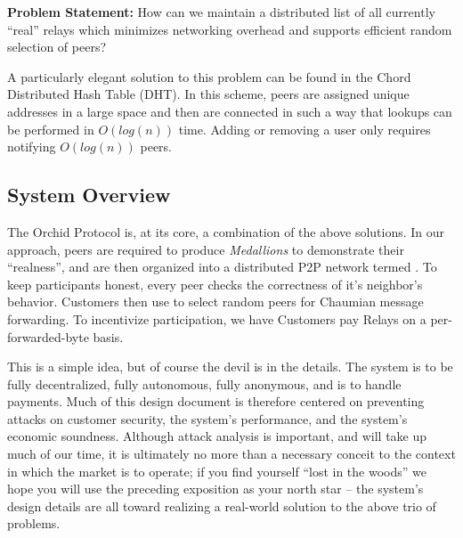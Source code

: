 \textbf{Problem Statement:} How can we maintain a distributed list of
all currently ``real'' relays which minimizes networking overhead and
supports efficient random selection of peers?

A particularly elegant solution to this problem can be found in the
Chord\cite{CHORD} Distributed Hash Table (DHT). In this scheme, peers
are assigned unique addresses in a large space and then are connected
in such a way that lookups can be performed in $O(log(n))$ time. Adding
or removing a user only requires notifying $O(log(n))$ peers.

\subsection{System Overview}

The Orchid Protocol is, at its core, a combination of the above
solutions. In our approach, peers are required to
produce \emph{Medallions} to demonstrate their ``realness'', and are
then organized into a distributed P2P network termed \tOM{}. To
keep \tOM{} participants honest, every peer checks the correctness of
it's neighbor's behavior. Customers then use \tOM{} to select random
peers for Chaumian message forwarding. To incentivize participation,
we have Customers pay Relays on a per-forwarded-byte basis.

This is a simple idea, but of course the devil is in the details. The
system is to be fully decentralized, fully autonomous, fully
anonymous, and is to handle payments. Much of this design document is
therefore centered on preventing attacks on customer security, the system's performance, and the system's economic soundness. Although attack analysis is important, and will take up
much of our time, it is ultimately no more than a necessary conceit to
the context in which the market is to operate; if you find yourself
``lost in the woods'' we hope you will use the preceding exposition as
your north star -- the system's design details are all toward
realizing a real-world solution to the above trio of problems.
